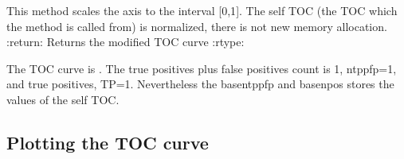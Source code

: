 \documentclass[letterpaper,10pt,english]{sphinxmanual}
\begin{document}
\begin{fulllineitems}
\label{\detokenize{usage:ootoc.TOC.normalize}}
\pysigstartsignatures
{}
\pysigstopsignatures
\sphinxAtStartPar
This method scales the axis to the interval {[}0,1{]}. The self TOC (the TOC which the method is called from) is normalized, there is not new memory allocation.
:return: Returns the modified TOC curve
:rtype: 

\sphinxAtStartPar
The  TOC curve is .
The  true positives plus false positives count is 1, ntppfp=1,
and true positives, TP=1.
Nevertheless the basentppfp and basenpos stores the values of the self TOC.

\end{fulllineitems}



\subsection{Plotting the TOC curve}
\label{\detokenize{usage:plotting-the-toc-curve}}
\end{document}
